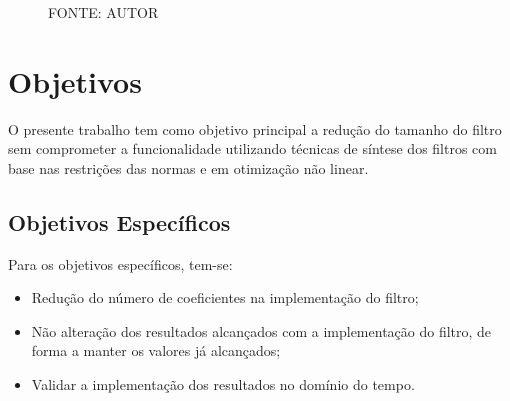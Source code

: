 \begin{figure}[H]
	\centering
	\caption{SISTEMA PROPOSTO COM FILTROS.}
	
	\caption*{FONTE: AUTOR}
	\label{SISTEMA PROPOSTO COM FILTROS.}
\end{figure}

\section{Objetivos}
O presente trabalho tem como objetivo principal a redução  do tamanho do filtro sem comprometer a funcionalidade utilizando técnicas de síntese dos filtros com base nas restrições das normas e em otimização não linear.
\subsection{Objetivos Específicos}
Para os objetivos específicos, tem-se:
\begin{itemize}
	\item Redução do número de coeficientes na implementação do filtro;
	\item Não alteração dos resultados alcançados com a implementação do filtro, de forma a manter os valores já alcançados;
	\item Validar a implementação dos resultados no domínio do tempo.
\end{itemize}


